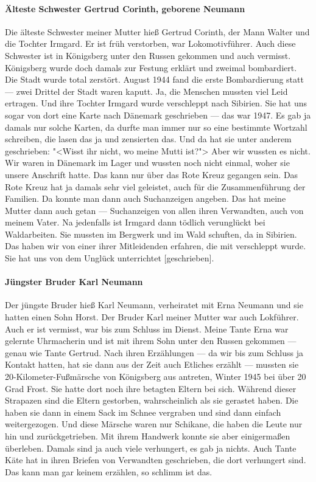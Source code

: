 \documentclass[12pt, twoside]{book}
\begin{document}
\paragraph{Älteste Schwester Gertrud Corinth, geborene Neumann} Die älteste Schwester meiner Mutter hieß Gertrud Corinth, der Mann Walter und die Tochter Irmgard.
Er ist früh verstorben, war Lokomotivführer. Auch diese Schwester ist in Königsberg unter den Russen gekommen und auch vermisst. 
Königsberg wurde doch damals zur Festung erklärt und zweimal bombardiert. Die Stadt wurde total zerstört.
August 1944 fand die erste Bombardierung statt --- zwei Drittel der Stadt waren kaputt. Ja, die Menschen mussten viel Leid ertragen.
Und ihre Tochter Irmgard wurde verschleppt nach Sibirien.
Sie hat uns sogar von dort eine Karte nach Dänemark geschrieben --- das war 1947. Es gab ja damals nur solche Karten, da durfte man immer nur so eine bestimmte Wortzahl schreiben, die lasen das ja und zensierten das.
Und da hat sie unter anderem geschrieben: "<Wisst ihr nicht, wo meine Mutti ist?"> Aber wir wussten es nicht. Wir waren in Dänemark im Lager und wussten noch nicht einmal, woher sie unsere Anschrift hatte.
Das kann nur über das Rote Kreuz gegangen sein.
Das Rote Kreuz hat ja damals sehr viel geleistet, auch für die Zusammenführung der Familien.
Da konnte man dann auch Suchanzeigen angeben. Das hat meine Mutter dann auch getan --- Suchanzeigen von allen ihren Verwandten, auch von meinem Vater.
Na jedenfalls ist Irmgard dann tödlich verunglückt bei Waldarbeiten. Sie mussten im Bergwerk und im Wald schuften, da in Sibirien. Das haben wir von einer ihrer Mitleidenden erfahren, die mit verschleppt wurde. Sie hat uns von dem Unglück unterrichtet [geschrieben].

\paragraph{Jüngster Bruder Karl Neumann} Der jüngste Bruder hieß Karl Neumann, verheiratet mit Erna Neumann und sie hatten einen Sohn Horst. Der Bruder Karl meiner Mutter war auch Lokführer. Auch er ist vermisst, war bis zum Schluss im Dienst.
Meine Tante Erna war gelernte Uhrmacherin und ist mit ihrem Sohn unter den Russen gekommen --- genau wie Tante Gertrud. Nach ihren Erzählungen --- da wir bis zum Schluss ja Kontakt hatten, hat sie dann aus der Zeit auch Etliches erzählt ---
mussten sie 20-Kilometer-Fußmärsche von Königsberg aus antreten, Winter 1945 bei über 20 Grad Frost. Sie hatte dort noch ihre betagten Eltern bei sich.
Während dieser Strapazen sind die Eltern gestorben, wahrscheinlich als sie gerastet haben.
Die haben sie dann in einem Sack im Schnee vergraben und sind dann einfach weitergezogen.
Und diese Märsche waren nur Schikane, die haben die Leute nur hin und zurückgetrieben.
Mit ihrem Handwerk konnte sie aber einigermaßen überleben. Damals sind ja auch viele verhungert, es gab ja nichts. Auch Tante Käte hat in ihren Briefen von Verwandten geschrieben, die dort verhungert sind.
Das kann man gar keinem erzählen, so schlimm ist das.
\end{document}
